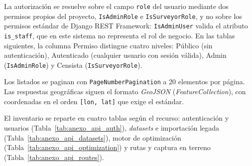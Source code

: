 La autorización se resuelve sobre el campo \texttt{role} del usuario mediante dos permisos propios
del proyecto, \texttt{IsAdminRole} e \texttt{IsSurveyorRole}, y no sobre los permisos estándar de
Django REST Framework: \texttt{IsAdminUser} valida el atributo \texttt{is\_staff}, que en este
sistema no representa el rol de negocio. En las tablas siguientes, la columna Permiso distingue
cuatro niveles: Público (sin autenticación), Autenticado (cualquier usuario con sesión válida),
Admin (\texttt{IsAdminRole}) y Censista (\texttt{IsSurveyorRole}).

Los listados se paginan con \texttt{PageNumberPagination} a 20 elementos por página. Las respuestas
geográficas siguen el formato \textit{GeoJSON} (\textit{FeatureCollection}), con coordenadas en el
orden \texttt{[lon, lat]} que exige el estándar.

El inventario se reparte en cuatro tablas según el recurso: autenticación y usuarios
(Tabla~\ref{tab:anexo_api_auth}), \textit{datasets} e importación legada
(Tabla~\ref{tab:anexo_api_datasets}), motor de optimización (Tabla~\ref{tab:anexo_api_optimization})
y rutas y captura en terreno (Tabla~\ref{tab:anexo_api_routes}).

